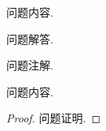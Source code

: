 \documentclass{article}
\begin{document}
\maketitle

\begin{problem}
问题内容.
\end{problem}

\begin{solution}
问题解答.
\end{solution}

\begin{note}
问题注解.
\end{note}

\begin{problem}
问题内容.
\end{problem}

\begin{proof}
问题证明.
\end{proof}

\end{document}
